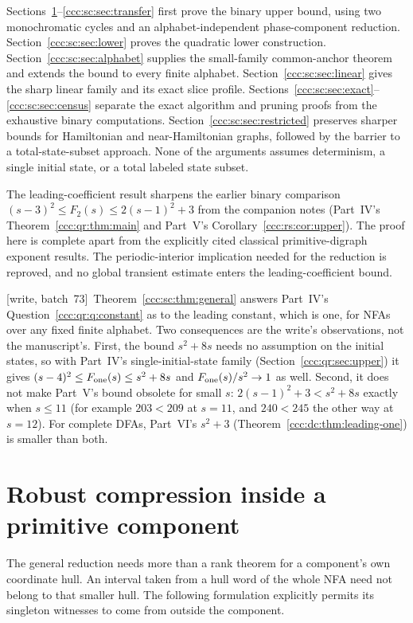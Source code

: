 \documentclass[11pt,letterpaper]{article}
\theoremstyle{definition}
\theoremstyle{remark}
\newcommand{\wsevthree}{\textup{[write, batch~73]}}
\begin{document}
Sections~\ref{ccc:sc:sec:primitive}--\ref{ccc:sc:sec:transfer} first prove the binary upper bound, using two monochromatic cycles and an alphabet-independent phase-component reduction. Section~\ref{ccc:sc:sec:lower} proves the quadratic lower construction. Section~\ref{ccc:sc:sec:alphabet} supplies the small-family common-anchor theorem and extends the bound to every finite alphabet. Section~\ref{ccc:sc:sec:linear} gives the sharp linear family and its exact slice profile. Sections~\ref{ccc:sc:sec:exact}--\ref{ccc:sc:sec:census} separate the exact algorithm and pruning proofs from the exhaustive binary computations. Section~\ref{ccc:sc:sec:restricted} preserves sharper bounds for Hamiltonian and near-Hamiltonian graphs, followed by the barrier to a total-state-subset approach. None of the arguments assumes determinism, a single initial state, or a total labeled state subset.

The leading-coefficient result sharpens the earlier binary comparison $(s-3)^2\le F_2(s)\le2(s-1)^2+3$ from the companion notes (Part~IV's Theorem~\ref{ccc:qr:thm:main} and Part~V's Corollary~\ref{ccc:rs:cor:upper}). The proof here is complete apart from the explicitly cited classical primitive-digraph exponent results. The periodic-interior implication needed for the reduction is reproved, and no global transient estimate enters the leading-coefficient bound.

\wsevthree\ Theorem~\ref{ccc:sc:thm:general} answers Part~IV's
Question~\ref{ccc:qr:q:constant} as to the leading constant, which is one,
for NFAs over any fixed finite alphabet. Two consequences are the write's
observations, not the manuscript's. First, the bound $s^2+8s$ needs no
assumption on the initial states, so with Part~IV's single-initial-state
family (Section~\ref{ccc:qr:sec:upper}) it gives
$(s-4)^2\le F_{\rm one}(s)\le s^2+8s$ and $F_{\rm one}(s)/s^2\to1$ as well.
Second, it does not make Part~V's bound obsolete for small $s$:
$2(s-1)^2+3<s^2+8s$ exactly when $s\le11$ (for example $203<209$ at
$s=11$, and $240<245$ the other way at $s=12$). For complete DFAs,
Part~VI's $s^2+3$ (Theorem~\ref{ccc:dc:thm:leading-one}) is smaller than
both.

\section{Robust compression inside a primitive component}\label{ccc:sc:sec:primitive}

The general reduction needs more than a rank theorem for a component's own coordinate hull. An interval taken from a hull word of the whole NFA need not belong to that smaller hull. The following formulation explicitly permits its singleton witnesses to come from outside the component.
\end{document}
